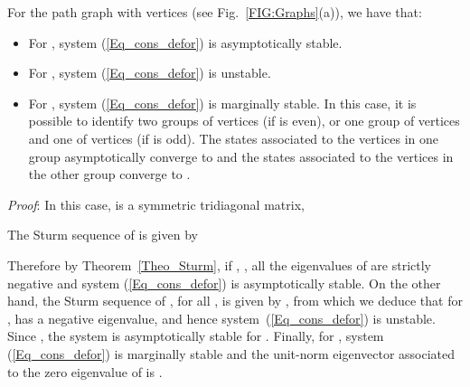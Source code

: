 \documentclass[letterpaper,9pt,twocolumn]{autart}
\begin{document}
\begin{proposition}\label{Prop_path}
For the path graph  with  vertices (see Fig.~\ref{FIG:Graphs}(a)), we have that:
\begin{itemize}
\item For , system (\ref{Eq_cons_defor}) is asymptotically stable.
\item For , system (\ref{Eq_cons_defor}) is unstable.
\item For , system (\ref{Eq_cons_defor}) is marginally stable.
In this case, it is possible to identify two groups of  vertices
(if  is even), or one group of  vertices
and one of  vertices (if  is odd).
The states associated to the vertices in one group asymptotically
converge to 
and the states associated to the vertices in the other group
converge to .
\end{itemize}
\emph{Proof}:
In this case,  is a symmetric tridiagonal matrix,

The Sturm sequence of  is given by

Therefore by Theorem~\ref{Theo_Sturm}, if , ,
all the eigenvalues of  are strictly negative and
system (\ref{Eq_cons_defor}) is asymptotically stable. On the other hand,
the Sturm sequence of , for all , is given by ,
from which we deduce that for ,  has a negative eigenvalue, and
hence system~(\ref{Eq_cons_defor}) is unstable.
Since , the system
is asymptotically stable for . Finally, for , system (\ref{Eq_cons_defor})
is marginally stable and the unit-norm
eigenvector associated to the zero eigenvalue of  is .
\hfill
\end{proposition}
\end{document}
